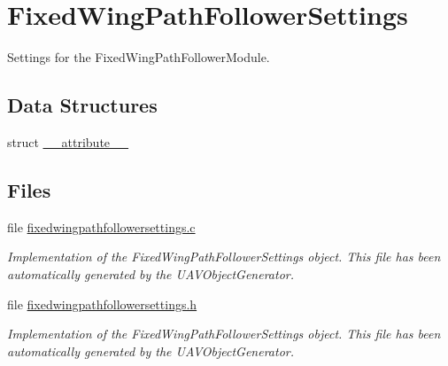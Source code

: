 \hypertarget{group___fixed_wing_path_follower_settings}{\section{\-Fixed\-Wing\-Path\-Follower\-Settings}
\label{group___fixed_wing_path_follower_settings}
}


\-Settings for the \-Fixed\-Wing\-Path\-Follower\-Module.  


\subsection*{\-Data \-Structures}
\begin{DoxyCompactItemize}
\item 
struct \hyperlink{struct____attribute____}{\-\_\-\-\_\-attribute\-\_\-\-\_\-}
\end{DoxyCompactItemize}
\subsection*{\-Files}
\begin{DoxyCompactItemize}
\item 
file \hyperlink{fixedwingpathfollowersettings_8c}{fixedwingpathfollowersettings.\-c}
\begin{DoxyCompactList}\small\item\em \-Implementation of the \-Fixed\-Wing\-Path\-Follower\-Settings object. \-This file has been automatically generated by the \-U\-A\-V\-Object\-Generator. \end{DoxyCompactList}\item 
file \hyperlink{fixedwingpathfollowersettings_8h}{fixedwingpathfollowersettings.\-h}
\begin{DoxyCompactList}\small\item\em \-Implementation of the \-Fixed\-Wing\-Path\-Follower\-Settings object. \-This file has been automatically generated by the \-U\-A\-V\-Object\-Generator. \end{DoxyCompactList}\end{DoxyCompactItemize}
